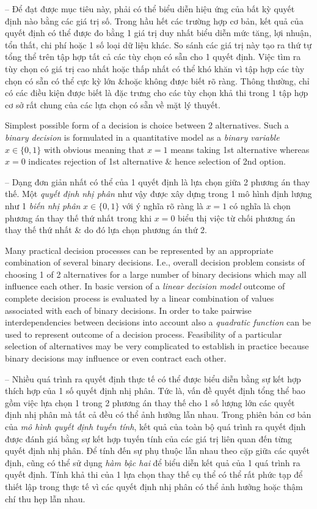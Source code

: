 \documentclass{article}
\begin{document}
\begin{itemize}
\begin{itemize}
        -- Để đạt được mục tiêu này, phải có thể biểu diễn hiệu ứng của bất kỳ quyết định nào bằng các giá trị số. Trong hầu hết các trường hợp cơ bản, kết quả của quyết định có thể được đo bằng 1 giá trị duy nhất biểu diễn mức tăng, lợi nhuận, tổn thất, chi phí hoặc 1 số loại dữ liệu khác. So sánh các giá trị này tạo ra thứ tự tổng thể trên tập hợp tất cả các tùy chọn có sẵn cho 1 quyết định. Việc tìm ra tùy chọn có giá trị cao nhất hoặc thấp nhất có thể khó khăn vì tập hợp các tùy chọn có sẵn có thể cực kỳ lớn \&{\tt}hoặc không được biết rõ ràng. Thông thường, chỉ có các điều kiện được biết là đặc trưng cho các tùy chọn khả thi trong 1 tập hợp cơ sở rất chung của các lựa chọn có sẵn về mặt lý thuyết.
        
        Simplest possible form of a decision is choice between 2 alternatives. Such a {\it binary decision} is formulated in a quantitative model as a {\it binary variable} $x\in\{0,1\}$ with obvious meaning that $x = 1$ means taking 1st alternative whereas $x = 0$ indicates rejection of 1st alternative \& hence selection of 2nd option.
        
        -- Dạng đơn giản nhất có thể của 1 quyết định là lựa chọn giữa 2 phương án thay thế. Một {\it quyết định nhị phân} như vậy được xây dựng trong 1 mô hình định lượng như 1 {\it biến nhị phân} $x\in\{0,1\}$ với ý nghĩa rõ ràng là $x = 1$ có nghĩa là chọn phương án thay thế thứ nhất trong khi $x = 0$ biểu thị việc từ chối phương án thay thế thứ nhất \& do đó lựa chọn phương án thứ 2.
        
        Many practical decision processes can be represented by an appropriate combination of several binary decisions. I.e., overall decision problem consists of choosing 1 of 2 alternatives for a large number of binary decisions which may all influence each other. In basic version of a {\it linear decision model} outcome of complete decision process is evaluated by a linear combination of values associated with each of binary decisions. In order to take pairwise interdependencies between decisions into account also a {\it quadratic function} can be used to represent outcome of a decision process. Feasibility of a particular selection of alternatives may be very complicated to establish in practice because binary decisions may influence or even contract each other.
        
        -- Nhiều quá trình ra quyết định thực tế có thể được biểu diễn bằng sự kết hợp thích hợp của 1 số quyết định nhị phân. Tức là, vấn đề quyết định tổng thể bao gồm việc lựa chọn 1 trong 2 phương án thay thế cho 1 số lượng lớn các quyết định nhị phân mà tất cả đều có thể ảnh hưởng lẫn nhau. Trong phiên bản cơ bản của {\it mô hình quyết định tuyến tính}, kết quả của toàn bộ quá trình ra quyết định được đánh giá bằng sự kết hợp tuyến tính của các giá trị liên quan đến từng quyết định nhị phân. Để tính đến sự phụ thuộc lẫn nhau theo cặp giữa các quyết định, cũng có thể sử dụng {\it hàm bậc hai} để biểu diễn kết quả của 1 quá trình ra quyết định. Tính khả thi của 1 lựa chọn thay thế cụ thể có thể rất phức tạp để thiết lập trong thực tế vì các quyết định nhị phân có thể ảnh hưởng hoặc thậm chí thu hẹp lẫn nhau.
        

\end{itemize}
\end{itemize}
\end{document}
